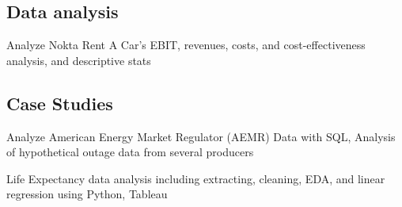 \documentclass[letter,10pt]{article}
\begin{document}
\subsection{{Data analysis
 \hfill}}
\justify{}
\begin{zitemize}
\item Analyze Nokta Rent A Car's EBIT, revenues, costs, and cost-effectiveness analysis, and descriptive stats
\end{zitemize}
\vspace{10}
\subsection{{Case Studies
 \hfill}}
\begin{zitemize}
\item  Analyze American Energy Market Regulator (AEMR) Data with SQL, Analysis of hypothetical outage data from several producers
\item Life Expectancy data analysis including extracting, cleaning, EDA, and linear regression using Python, Tableau

\end{zitemize}




\end{document}
